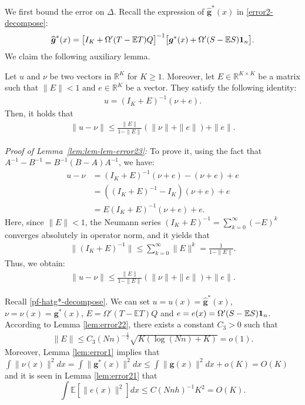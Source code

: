 \documentclass[preprint,11pt]{article}
\newcommand{\mbb}{\mathbb}
\newcommand{\bg}{{\boldsymbol g}}
\numberwithin{equation}{section}
\begin{document}
We first bound the error on $\Delta$. Recall the expression of $\widehat{\bm{g}}^*(x)$ in \eqref{error2-decompose}:
\begin{align}\label{pf-hatg*-decompose} 
\widehat{\boldsymbol g}^*(x) = \bigl[I_K +\Omega'(T-\mathbb{E}T)Q\bigr]^{-1}\bigl[\bg^*(x) + \Omega'(S-\mathbb{E}S){\bf 1}_n\bigr]. 
\end{align}
We claim the following auxiliary lemma.
\begin{lemma}\label{lem:lem-lem-error23}
    Let $u$ and $\nu$ be two vectors in $\mbb{R}^K$ for $K\ge 1$. Moreover, let $E\in\mbb{R}^{K\times K}$ be a matrix such that $\|E\|<1$ and $e\in\mbb{R}^K$ be a vector. They satisfy the following identity:
    \begin{align*}
        u=(I_K+E)^{-1}(\nu+e).
    \end{align*}
    Then, it holds that
    \begin{align*}
        \|u-\nu\|\le \frac{\|E\|}{1-\|E\|}(\|\nu\|+\|e\|)+\|e\|.
    \end{align*}
\end{lemma}
\noindent
{\it Proof of Lemma~\ref{lem:lem-lem-error23}:} To prove it, using the fact that $A^{-1}-B^{-1}=B^{-1}(B-A)A^{-1}$, we have:
\begin{align*}
    u-\nu &=(I_K+E)^{-1}(\nu+e)-(\nu+e)+e\\
    &=((I_K+E)^{-1}-I_K)(\nu+e)+e\\
    &=E(I_K+E)^{-1}(\nu+e)+e.
\end{align*}
Here, since $\|E\|<1$, the Neumann series $(I_K+E)^{-1}=\sum_{k=0}^\infty(-E)^k$ converges absolutely in operator norm, and it yields that
\begin{align*}
    \|(I_K+E)^{-1}\|\le \sum_{k=0}^\infty\|E\|^k=\frac{1}{1-\|E\|}.
\end{align*}
Thus, we obtain:
\begin{align*}
    \|u-\nu \|\le \frac{\|E\|}{1-\|E\|}(\|\nu\|+\|e\|)+\|e\|.
\end{align*}

Recall \eqref{pf-hatg*-decompose}. We can set $u=u(x)=\bm{\widehat{g}}^*(x)$, $\nu=\nu(x)=\bm{g}^*(x)$, $E=\Omega'(T-\mathbb{E}T)Q$ and $e=e(x)=\Omega'(S-\mathbb{E}S){\bf 1}_n$. According to Lemma \ref{lem:error22}, there exists a constant $C_3>0$ such that
\begin{align*}
    \|E\|\le C_3(Nn)^{-\frac{1}{2}}\sqrt{K(\log (Nn) +K)}=o(1).
\end{align*}
Moreover, Lemma \ref{lem:error1} implies that $\int \|\nu(x)\|^2dx=\int \|\bm{g}^*(x)\|^2dx\le \int \|\bm{g}(x)\|^2dx+o(K)=O(K)$ and it is seen in Lemma \ref{lem:error21} that $$\int\mbb{E}[\|e(x)\|^2]dx\le C(Nnh)^{-1}K^2=O(K).$$
\end{document}
